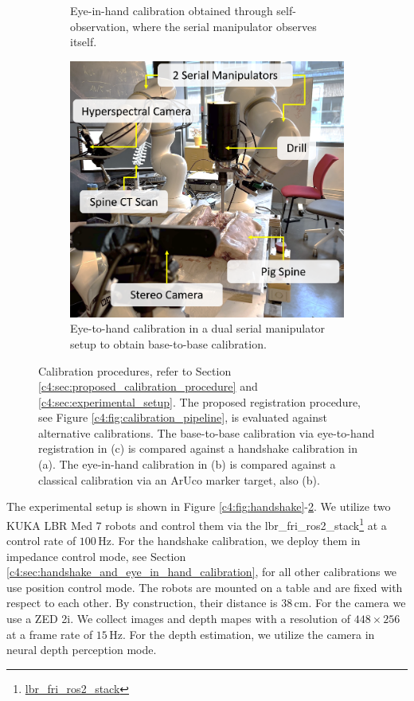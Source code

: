 \begin{figure}
\begin{subfigure}[b]{0.3\textwidth}
         \caption{Eye-in-hand calibration obtained through self-observation, where the serial manipulator observes itself.}
         \label{c4:fig:eye_in_hand}
     \end{subfigure}
     \hfill
     \begin{subfigure}[b]{0.3\textwidth}
         \centering
         \includegraphics[width=\textwidth]{fig/eye_to_hand.png}
         \caption{Eye-to-hand calibration in a dual serial manipulator setup to obtain base-to-base calibration.}
         \label{c4:fig:eye_to_hand}
     \end{subfigure}
    \caption{Calibration procedures, refer to Section \ref{c4:sec:proposed_calibration_procedure} and \ref{c4:sec:experimental_setup}. The proposed registration procedure, see Figure \ref{c4:fig:calibration_pipeline}, is evaluated against alternative calibrations. The base-to-base calibration via eye-to-hand registration in (c) is compared against a handshake calibration in (a). The eye-in-hand calibration in (b) is compared against a classical calibration via an ArUco marker target, also (b).}
    \label{c4:fig:calibrations}
\end{figure}

The experimental setup is shown in Figure \ref{c4:fig:handshake}-\ref{c4:fig:eye_to_hand}. We utilize two KUKA LBR Med 7 robots and control them via the lbr\_fri\_ros2\_stack\footnote{\href{https://github.com/kCL-BMEIS/lbr_fri_ros2_stack}{lbr\_fri\_ros2\_stack}} at a control rate of $100\,\text{Hz}$. For the handshake calibration, we deploy them in impedance control mode, see Section \ref{c4:sec:handshake_and_eye_in_hand_calibration}, for all other calibrations we use position control mode. The robots are mounted on a table and are fixed with respect to each other. By construction, their distance is $38\,\text{cm}$. For the camera we use a ZED 2i. We collect images and depth mapes with a resolution of $448 \times 256$ at a frame rate of $15\,\text{Hz}$. For the depth estimation, we utilize the camera in neural depth perception mode.

